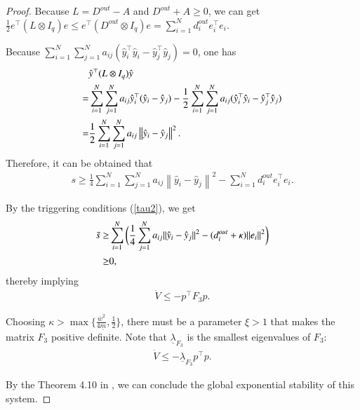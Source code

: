 \documentclass[final,5p,times,twocolumn,authoryear]{elsarticle}
\begin{document}
\begin{proof}
	Because $L=D^{out}-A$ and $D^{out}+A\ge0$, we can get $\frac{1}{2}e^\top (L\otimes I_q)e \le e^\top (D^{out}\otimes I_q)e = \sum_{i=1}^{N}d^{out}_ie_i^\top e_i$.
	
	Because $\sum_{i=1}^{N}\sum_{j=1}^{N}a_{ij}(\hat y_i^\top \hat y_i - \hat y_j^\top \hat y_j)=0$, one has
	\begin{align}
		&\hat y^\top (L\otimes I_q)\hat y\notag\\
		=&\sum_{i=1}^{N}\sum_{j=1}^{N}a_{ij}\hat y_i^\top (\hat y_i-\hat y_j) - \frac{1}{2}\sum_{i=1}^{N} \sum_{j=1}^{N}a_{ij}(\hat y_i^\top \hat y_i - \hat y_j^\top \hat y_j)\notag\\
		=&\frac{1}{2}\sum_{i=1}^{N}\sum_{j=1}^{N} a_{ij}\left\|\hat y_i - \hat y_j \right\|^2.
	\end{align}
	Therefore, it can be obtained that
	\begin{align}
		s\ge \frac{1}{4}\sum_{i=1}^{N}\sum_{j=1}^{N} a_{ij}\left\|\hat y_i - \hat y_j \right\|^2 - \sum_{i=1}^{N}d^{out}_ie_i^\top e_i.
	\end{align}
	
	By the triggering conditions (\ref{tau2}), we get
	\begin{align}
		\bar s\ge &\sum_{i=1}^{N} \bigg(\frac{1}{4}\sum_{j=1}^{N} a_{ij}\|\hat y_i - \hat y_j \|^2 - (d^{out}_i+\kappa)\|e_i\|^2 \bigg)\notag\\
		\ge &0,
	\end{align}
	thereby implying
	\begin{align}
		\dot{V}\le -p^\top F_3p.
	\end{align}
	
	Choosing $\kappa>\max\{\frac{\overline{w}^2}{4\underline m}, \frac{1}{2}\}$, there must be a parameter $\xi>1$ that makes the matrix $F_3$ positive definite. Note that $\underline \lambda_{F_3}$ is the smallest eigenvalues of $F_3$:
	\begin{align}
		\dot V \le -\underline \lambda_{F_3}p^\top p.
	\end{align}
	
	By the Theorem 4.10 in \citet{nonlinear}, we can conclude the global exponential stability of this system.
\end{proof}
\end{document}

